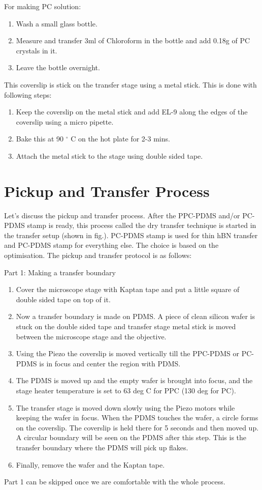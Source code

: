 For making PC solution:
\begin{enumerate}
\item Wash a small glass bottle. 
\item Measure and transfer 3ml of Chloroform in the bottle and add 0.18g of PC crystals in it.
\item Leave the bottle overnight.
\end{enumerate}
This coverslip is stick on the transfer stage using a metal stick. This is done with following steps:
\begin{enumerate}
\item Keep the coverslip on the metal stick and add EL-9 along the edges of the coverslip using a micro pipette.
\item Bake this at 90 $^{\circ}$ C on the hot plate for 2-3 mins.
\item Attach the metal stick to the stage using double sided tape.
\end{enumerate}

\section{Pickup and Transfer Process}

Let's discuss the pickup and transfer process. After the PPC-PDMS and/or PC-PDMS stamp is ready, this process called the dry transfer technique \cite{Kim16} \cite{Wang614} is started in the transfer setup (shown in fig.). PC-PDMS stamp is used for thin hBN transfer and PC-PDMS stamp for everything else. The choice is based on the optimisation. The pickup and transfer protocol is as follows:

Part 1: Making a transfer boundary
\begin{enumerate}
\item Cover the microscope stage with Kaptan tape and put a little square of double sided tape on top of it.
\item Now a transfer boundary is made on PDMS. A piece of clean silicon wafer is stuck on the double sided tape and transfer stage metal stick is moved between the microscope stage and the objective.
\item Using the Piezo the coverslip is moved vertically till the PPC-PDMS or PC-PDMS is in focus and center the region with PDMS. 
\item The PDMS is moved up and the empty wafer is brought into focus, and the stage heater temperature is set to 63 deg C for PPC (130 deg for PC).
\item The transfer stage is moved down slowly using the Piezo motors while keeping the wafer in focus. When the PDMS touches the wafer, a circle forms on the coverslip. The coverslip is held there for 5 seconds and then moved up.  A circular boundary will be seen on the PDMS after this step. This is the transfer boundary where the PDMS will pick up flakes.
\item Finally, remove the wafer and the Kaptan tape.
\end{enumerate}
Part 1 can be skipped once we are comfortable with the whole process.

